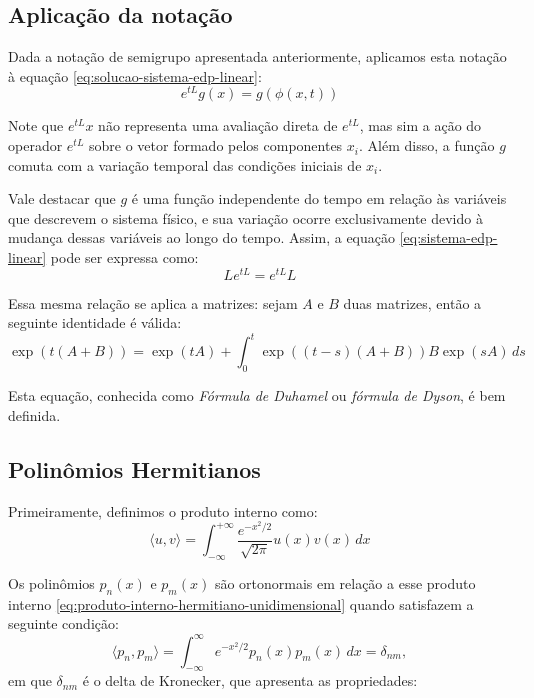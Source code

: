 \documentclass[12pt]{article}
\begin{document}
\subsection{Aplicação da notação}
Dada a notação de semigrupo apresentada anteriormente, aplicamos esta notação à equação \eqref{eq:solucao-sistema-edp-linear}:
\begin{equation}
	e^{tL}g(x) = g(\phi(x,t))
	\label{eq:solucao-sistema-edp-linear-semigrupo}
\end{equation}

Note que $e^{tL}x$ não representa uma avaliação direta de $e^{tL}$, mas sim a ação do operador $e^{tL}$ sobre o vetor formado pelos componentes $x_i$. Além disso, a função $g$ comuta com a variação temporal das condições iniciais de $x_i$. 

Vale destacar que $g$ é uma função independente do tempo em relação às variáveis que descrevem o sistema físico, e sua variação ocorre exclusivamente devido à mudança dessas variáveis ao longo do tempo. Assim, a equação \eqref{eq:sistema-edp-linear} pode ser expressa como:
\begin{equation}
	Le^{tL} = e^{tL}L
\end{equation}

Essa mesma relação se aplica a matrizes: sejam $A$ e $B$ duas matrizes, então a seguinte identidade é válida:
\begin{equation}
	\exp(t(A+B)) = \exp(tA) + \int_0^t \exp\left((t-s)(A+B)\right)B\exp(sA) \, ds
	\label{eq:formula-de-duhamel}
\end{equation}

Esta equação, conhecida como \textit{Fórmula de Duhamel} ou \textit{fórmula de Dyson}, é bem definida.

\subsection{Polinômios Hermitianos}

Primeiramente, definimos o produto interno como:
\begin{equation}
    \langle u, v \rangle = \int_{-\infty}^{+\infty} \frac{e^{-x^2/2}}{\sqrt{2 \pi}} u(x) v(x) \, dx
    \label{eq:produto-interno-hermitiano-unidimensional}
\end{equation}

Os polinômios $p_n(x)$ e $p_m(x)$ são ortonormais em relação a esse produto interno \eqref{eq:produto-interno-hermitiano-unidimensional} quando satisfazem a seguinte condição:
\begin{equation*}
    \langle p_n, p_m \rangle = \int_{-\infty}^{\infty} e^{-x^2/2} p_n(x) p_m(x) \, dx = \delta_{nm},
\end{equation*}
em que $\delta_{nm}$ é o delta de Kronecker, que apresenta as propriedades:
\end{document}
